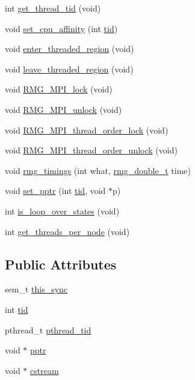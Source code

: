 \begin{DoxyCompactItemize}
\item 
int \hyperlink{class_base_thread_a2853c4986b07a66aab1cc6920617a6d6}{get\-\_\-thread\-\_\-tid} (void)
\item 
void \hyperlink{class_base_thread_a4ce9101a4bb0710a38b0185c479e98b3}{set\-\_\-cpu\-\_\-affinity} (int \hyperlink{class_base_thread_a98cb2fa092cfd40fcdc3992096e58db8}{tid})
\item 
void \hyperlink{class_base_thread_a7359b4e6a0b9c9cfba65ae6bc71579b1}{enter\-\_\-threaded\-\_\-region} (void)
\item 
void \hyperlink{class_base_thread_af49f0db38134e50c57b0fc7df0588dd2}{leave\-\_\-threaded\-\_\-region} (void)
\item 
void \hyperlink{class_base_thread_a0a6181d82b7292cf7de14bf8a5c5ce78}{R\-M\-G\-\_\-\-M\-P\-I\-\_\-lock} (void)
\item 
void \hyperlink{class_base_thread_a7f18dda8c6a7664e6b1b81d258ca8ae5}{R\-M\-G\-\_\-\-M\-P\-I\-\_\-unlock} (void)
\item 
void \hyperlink{class_base_thread_a3973f80b4c6b8dc40b0ed8fc24b5b15f}{R\-M\-G\-\_\-\-M\-P\-I\-\_\-thread\-\_\-order\-\_\-lock} (void)
\item 
void \hyperlink{class_base_thread_a73632ec3a4524b7679ada9e7141e853d}{R\-M\-G\-\_\-\-M\-P\-I\-\_\-thread\-\_\-order\-\_\-unlock} (void)
\item 
void \hyperlink{class_base_thread_ac5e2b09ea312b50398c3189ee2f013d4}{rmg\-\_\-timings} (int what, \hyperlink{rmgtypes_8h_aaa16921c14f121c56eaa42390a340db8}{rmg\-\_\-double\-\_\-t} time)
\item 
void \hyperlink{class_base_thread_a059cba78f699335588a2bb7df82daf95}{set\-\_\-pptr} (int \hyperlink{class_base_thread_a98cb2fa092cfd40fcdc3992096e58db8}{tid}, void $\ast$p)
\item 
int \hyperlink{class_base_thread_af29eccdcc3030f0e6fb871aa073f8a89}{is\-\_\-loop\-\_\-over\-\_\-states} (void)
\item 
int \hyperlink{class_base_thread_adaca1cce9591271eb6836b657dcde5d1}{get\-\_\-threads\-\_\-per\-\_\-node} (void)
\end{DoxyCompactItemize}
\subsection*{Public Attributes}
\begin{DoxyCompactItemize}
\item 
sem\-\_\-t \hyperlink{class_base_thread_accfa214a7f01edea97f022f60ac58ba9}{this\-\_\-sync}
\item 
int \hyperlink{class_base_thread_a98cb2fa092cfd40fcdc3992096e58db8}{tid}
\item 
pthread\-\_\-t \hyperlink{class_base_thread_a40086f0b84a2cf98eb1a0e0081d0055c}{pthread\-\_\-tid}
\item 
void $\ast$ \hyperlink{class_base_thread_a9a04cf502a8bf373cb1232f10db68133}{pptr}
\item 
void $\ast$ \hyperlink{class_base_thread_ac00eb46a1fbf936f2f6b15dca0af7511}{cstream}
\end{DoxyCompactItemize}
